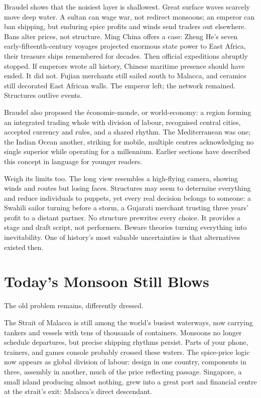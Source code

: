 Braudel shows that the noisiest layer is shallowest. Great surface waves scarcely move deep water. A sultan can wage war, not redirect monsoons; an emperor can ban shipping, but enduring spice profits and winds send traders out elsewhere. Bans alter prices, not structure. Ming China offers a case: Zheng He's seven early-fifteenth-century voyages projected enormous state power to East Africa, their treasure ships remembered for decades. Then official expeditions abruptly stopped. If emperors wrote all history, Chinese maritime presence should have ended. It did not. Fujian merchants still sailed south to Malacca, and ceramics still decorated East African walls. The emperor left; the network remained. Structures outlive events.

Braudel also proposed the économie-monde, or world-economy: a region forming an integrated trading whole with division of labour, recognised central cities, accepted currency and rules, and a shared rhythm. The Mediterranean was one; the Indian Ocean another, striking for mobile, multiple centres acknowledging no single superior while operating for a millennium. Earlier sections have described this concept in language for younger readers.

Weigh its limits too. The long view resembles a high-flying camera, showing winds and routes but losing faces. Structures may seem to determine everything and reduce individuals to puppets, yet every real decision belongs to someone: a Swahili sailor turning before a storm, a Gujarati merchant trusting three years' profit to a distant partner. No structure prewrites every choice. It provides a stage and draft script, not performers. Beware theories turning everything into inevitability. One of history's most valuable uncertainties is that alternatives existed then.

\section{Today's Monsoon Still Blows}
The old problem remains, differently dressed.

The Strait of Malacca is still among the world's busiest waterways, now carrying tankers and vessels with tens of thousands of containers. Monsoons no longer schedule departures, but precise shipping rhythms persist. Parts of your phone, trainers, and games console probably crossed these waters. The spice-price logic now appears as global division of labour: design in one country, components in three, assembly in another, much of the price reflecting passage. Singapore, a small island producing almost nothing, grew into a great port and financial centre at the strait's exit: Malacca's direct descendant.

